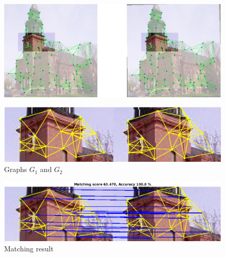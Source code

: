 \documentclass[
	fontsize=12pt,
	paper=a4,
	twoside=false,
	numbers=noenddot,
	plainheadsepline,
	toc=listof,
	toc=bibliography
]{scrartcl}
\begin{document}
\begin{figure} [htb] \centering
	\includegraphics[scale = 0.3]{test1/subregions.png}
\end{figure}
\begin{figure} [hb] \centering
	\includegraphics[scale = 0.4]{test1/subgraphs.png}
	\caption{Graphs $G_1$ and $G_2$}
\end{figure}
\begin{figure} [hb] \centering
	\includegraphics[scale = 0.4]{test1/matching_result.png}
	\caption{ Matching result}
\end{figure}

\FloatBarrier

\newpage
\end{document}
